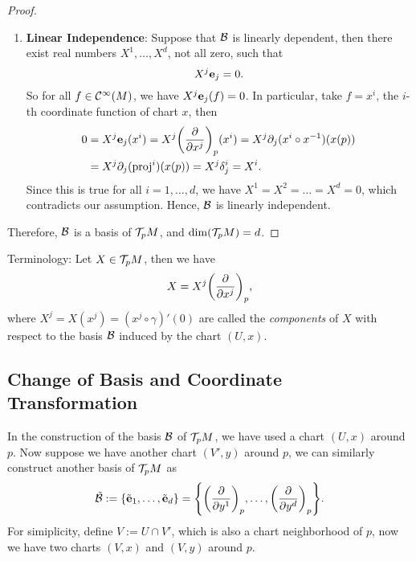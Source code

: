 \begin{proof}
\begin{enumerate}
        \item \textbf{Linear Independence}: Suppose that \(\mathcal B\) is linearly dependent, then there exist real numbers \(X^1, \ldots, X^d\), not all zero, such that
              \begin{equation}
                  X^j \vb{e}_j = 0.
              \end{equation}
              So for all \(f \in \mathcal C^\infty(M)\), we have \(X^j \vb{e}_j(f) = 0\). In particular, take \(f = x^i\), the \(i\)-th coordinate function of chart \(x\), then
              \begin{align*}
                  0 & = X^j \vb{e}_j(x^i) = X^j \qty(\pdv{x^j})_p (x^i) = X^j \partial_j (x^i \circ x^{-1})(x(p)) \\
                    & = X^j \partial_j (\operatorname{proj}^i) (x(p)) = X^j \delta_j^i = X^i.
              \end{align*}
              Since this is true for all \(i = 1, \ldots, d\), we have \(X^1 = X^2 = \ldots = X^d = 0\), which contradicts our assumption. Hence, \(\mathcal B\) is linearly independent.
    \end{enumerate}
    Therefore, \(\mathcal B\) is a basis of \(\mathcal T_p M\), and \(\dim(\mathcal T_p M) = d\).
\end{proof}
Terminology: Let \(X \in \mathcal T_p M\), then we have
\begin{equation}
    X = X^j \qty(\pdv{x^j})_p,
\end{equation}
where \(X^j = X(x^j) = (x^j \circ \gamma)'(0)\) are called the \emph{components} of \(X\) with respect to the basis \(\mathcal B\) induced by the chart \((U, x)\).

\subsection{Change of Basis and Coordinate Transformation}

In the construction of the basis \(\mathcal B\) of \(\mathcal T_p M\), we have used a chart \((U, x)\) around \(p\). Now suppose we have another chart \((V', y)\) around \(p\), we can similarly construct another basis of \(\mathcal T_p M\) as
\begin{equation}
    \tilde{\mathcal B} := \qty{\tilde{\vb{e}}_1, \ldots, \tilde{\vb{e}}_d} = \qty{\qty(\pdv{y^1})_p, \ldots, \qty(\pdv{y^d})_p}.
\end{equation}
For simiplicity, define \(V := U \cap V'\), which is also a chart neighborhood of \(p\), now we have two charts \((V, x)\) and \((V, y)\) around \(p\).

